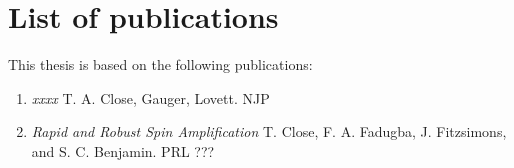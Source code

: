 
\section*{List of publications} 

This thesis is based on the following publications: %

\begin{enumerate}

\item \emph{xxxx} 
T. A. Close, Gauger, Lovett. NJP

\item \emph{Rapid and Robust Spin Amplification}
T. Close, F. A. Fadugba, J. Fitzsimons, and S. C. Benjamin. PRL ??? 


\end{enumerate}
